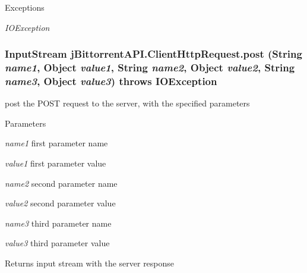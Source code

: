 \begin{DoxyExceptions}{Exceptions}
\item[{\em IOException}]\end{DoxyExceptions}
\hypertarget{classj_bittorrent_a_p_i_1_1_client_http_request_af66232ad6754f2c5b74c9f48dc36d974}{
\subsubsection[{post}]{\setlength{\rightskip}{0pt plus 5cm}InputStream jBittorrentAPI.ClientHttpRequest.post (String {\em name1}, \/  Object {\em value1}, \/  String {\em name2}, \/  Object {\em value2}, \/  String {\em name3}, \/  Object {\em value3})  throws IOException }}
\label{classj_bittorrent_a_p_i_1_1_client_http_request_af66232ad6754f2c5b74c9f48dc36d974}
post the POST request to the server, with the specified parameters 
\begin{DoxyParams}{Parameters}
\item[{\em name1}]first parameter name \item[{\em value1}]first parameter value \item[{\em name2}]second parameter name \item[{\em value2}]second parameter value \item[{\em name3}]third parameter name \item[{\em value3}]third parameter value \end{DoxyParams}
\begin{DoxyReturn}{Returns}
input stream with the server response 
\end{DoxyReturn}

